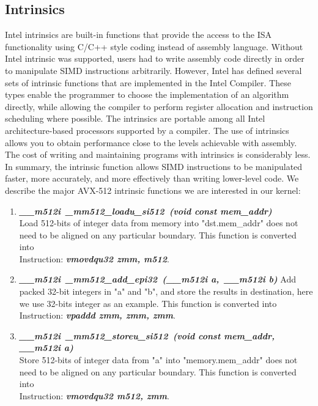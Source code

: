 \documentclass[sigconf,review]{acmart}
\begin{document}
\subsection{Intrinsics}
Intel intrinsics are built-in functions
that provide the access to the ISA functionality using C/C++ style coding instead of assembly
language. Without Intel intrinsic was supported, users had to
write assembly code directly in order to manipulate SIMD
instructions arbitrarily.
However, Intel has defined several sets of intrinsic functions that are implemented in the Intel
Compiler. These types enable the programmer to choose the implementation
of an algorithm directly, while allowing the compiler to perform register allocation and instruction
scheduling where possible. The intrinsics are portable among all Intel architecture-based processors supported
by a compiler. The use of intrinsics allows you to obtain performance close to the levels achievable with assembly.
The cost of writing and maintaining programs with intrinsics is considerably less.
In summary, the intrinsic function
allows SIMD instructions to be manipulated faster, more
accurately, and more effectively than writing lower-level code.
We describe the major AVX-512 intrinsic functions we are interested in our kernel:

\begin{enumerate}
  \item \emph{\textbf{\textit{\_\_m512i\ \_mm512\_loadu\_si512\ (void const\* mem\_addr)}}} \\
  Load 512-bits of integer data from memory into "dst.mem\_addr" does not need to be aligned on any particular boundary.
  This function is converted into \\ Instruction: \emph{\textbf{\textit{vmovdqu32  zmm,  m512}}}.
  \item \emph{\textbf{\textit{\_\_m512i\ \_mm512\_add\_epi32\ (\_\_m512i a,\ \_\_m512i b)}}}
  Add packed 32-bit integers in "a" and "b", and store the results in destination, here we use 32-bits integer as an example.
  This function is converted into \\ Instruction: \emph{\textbf{\textit{vpaddd  zmm,  zmm,  zmm}}}.
  \item \emph{\textbf{\textit{\_\_m512i\ \_mm512\_storeu\_si512\ (void const\* mem\_addr, \_\_m512i a)}}} \\
  Store 512-bits of integer data from "a" into "memory.mem\_addr" does not need to be aligned on any particular boundary.
  This function is converted into \\ Instruction: \emph{\textbf{\textit{vmovdqu32  m512, zmm}}}.
\end{enumerate}
\end{document}
